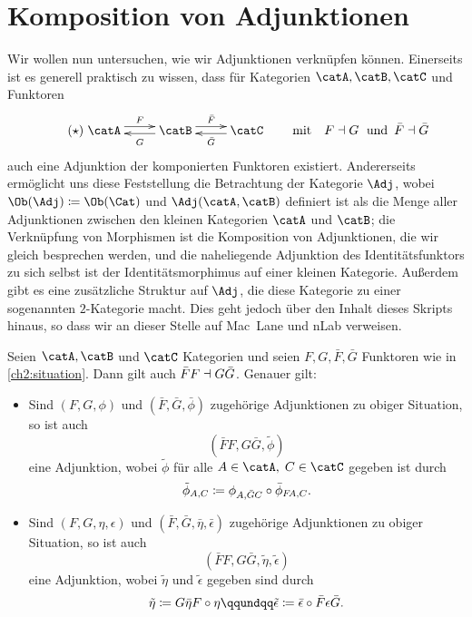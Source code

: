 \chapter{Komposition von Adjunktionen}
Wir wollen nun untersuchen, wie wir Adjunktionen verknüpfen können. Einerseits
ist es generell praktisch zu wissen, dass für Kategorien $\catA,\catB,\catC$ und
Funktoren
\vspace{-1mm}
\[ \tag{$\star$} \label{ch2:situation}
    \xymatrix{ \catA \ar@<3.5pt>[r]^F & \ar@<2pt>[l]^{G\vphantom{\bar G}} \catB 
    \ar@<3.5pt>[r]^{\bar F} & \ar@<2pt>[l]^{\bar G} \catC
    }
    \qquad\text{mit}\quad 
    F\leftadjoint G \text{\; und \,} \bar F\leftadjoint\bar G
\]
auch eine Adjunktion der komponierten Funktoren existiert. Andererseits
ermöglicht uns diese Feststellung die Betrachtung der Kategorie $\Adj$, wobei
$\Ob(\Adj)\defeq\Ob(\Cat)$ und $\Adj(\catA,\catB)$ definiert ist als die 
Menge aller Adjunktionen %
zwischen den kleinen Kategorien $\catA$ und $\catB$;
die Verknüpfung von Morphismen ist die Komposition von Adjunktionen, die wir 
gleich besprechen werden, und die naheliegende Adjunktion des
Identitätsfunktors zu sich selbst ist der Identitätsmorphimus auf einer kleinen
Kategorie. Außerdem gibt es eine zusätzliche Struktur auf $\Adj$, die diese
Kategorie zu einer sogenannten $2$-Kategorie macht. Dies geht jedoch über den
Inhalt dieses Skripts hinaus, so dass wir an dieser Stelle auf 
Mac~Lane\cite[\S\,IV.8,\;\S\,XII.3]{bookc:maclane97} und 
nLab\cite{www:nlab:2category} verweisen.

\begin{thProposition}
    \label{ch2:kompos}
    Seien $\catA,\catB$ und $\catC$ Kategorien und seien $F,G,\bar F,\bar G$
    Funktoren wie in \eqref{ch2:situation}.
    Dann gilt auch $\bar F F \dashv G\bar G$.
    Genauer gilt:
    \begin{itemize}
        \item
            Sind $(F,G,\phi)$ und $(\bar F,\bar G,\bar\phi)$ zugehörige
            Adjunktionen zu obiger Situation, so ist auch
            \[ (\bar F F, G\bar G, \tilde\phi) \]  
            eine Adjunktion, wobei $\tilde\phi$ für alle 
            $A\in\catA,\; C\in\catC$ gegeben ist durch
            \[ \tilde\phi_{A,C} \defeq 
                \phi_{A,\bar GC} \after \bar\phi_{F\!A,C}
            . \]

        \item
            Sind $(F,G,\eta,\epsilon)$ und $(\bar F, \bar G, \bar\eta,
            \bar\epsilon)$ zugehörige Adjunktionen zu obiger Situation, so ist
            auch
            \[ (\bar F F, G\bar G, \tilde\eta, \tilde\epsilon) \]
            eine Adjunktion, wobei $\tilde\eta$ und $\tilde\epsilon$ gegeben
            sind durch
            \[ \tilde\eta \defeq G\bar\eta F \after \eta
                \qqundqq
                \tilde\epsilon \defeq \bar\epsilon \after \bar F\epsilon \bar G
            . \]
    \end{itemize}
\end{thProposition}

